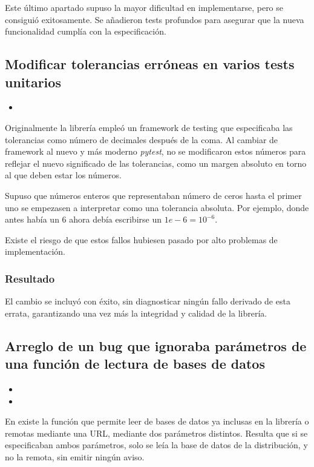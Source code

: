 Este último apartado supuso la mayor dificultad en implementarse, pero se consiguió exitosamente. Se añadieron tests profundos para asegurar que la nueva funcionalidad cumplía con la especificación.

\subsection{Modificar tolerancias erróneas en varios tests unitarios}

\begin{itemize}
    \item {}
\end{itemize}

Originalmente la librería empleó un framework de testing que especificaba las tolerancias como número de decimales después de la coma. Al cambiar de framework al nuevo y más moderno \textit{pytest}, no se modificaron estos números para reflejar el nuevo significado de las tolerancias, como un margen absoluto en torno al que deben estar los números.

Supuso que números enteros que representaban número de ceros hasta el primer uno se empezasen a interpretar como una tolerancia absoluta. Por ejemplo, donde antes había un $6$ ahora debía escribirse un $1e-6 = 10^{-6}$.

Existe el riesgo de que estos fallos hubiesen pasado por alto problemas de implementación.

\subsubsection{Resultado}

El cambio se incluyó con éxito, sin diagnosticar ningún fallo derivado de esta errata, garantizando una vez más la integridad y calidad de la librería.

\subsection{Arreglo de un bug que ignoraba parámetros de una función de lectura de bases de datos}

\begin{itemize}
    \item {}
    \item {}
\end{itemize}

En \pvlibpy{} existe la función  que permite leer de bases de datos ya inclusas en la librería o remotas mediante una URL, mediante dos parámetros distintos. Resulta que si se especificaban ambos parámetros, solo se leía la base de datos de la distribución, y no la remota, sin emitir ningún aviso.

